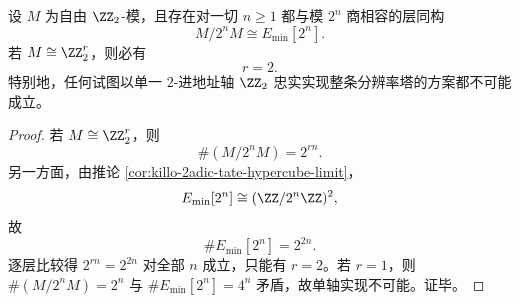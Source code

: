 \begin{corollary}\label{cor:xi-time-part9gc-resolution-tower-rank-two-rigidity}
设 \(M\) 为自由 \(\ZZ_2\)-模，且存在对一切 \(n\ge 1\) 都与模 \(2^n\) 商相容的层同构
\[
M/2^nM\cong E_{\min}[2^n].
\]
若 \(M\cong \ZZ_2^r\)，则必有
\[
r=2.
\]
特别地，任何试图以单一 \(2\)-进地址轴 \(\ZZ_2\) 忠实实现整条分辨率塔的方案都不可能成立。
\end{corollary}
\begin{proof}
若 \(M\cong \ZZ_2^r\)，则
\[
\#(M/2^nM)=2^{rn}.
\]
另一方面，由推论 \ref{cor:killo-2adic-tate-hypercube-limit}，
\[
E_{\min}[2^n]\cong (\ZZ/2^n\ZZ)^2,
\]
故
\[
\#E_{\min}[2^n]=2^{2n}.
\]
逐层比较得 \(2^{rn}=2^{2n}\) 对全部 \(n\) 成立，只能有 \(r=2\)。若 \(r=1\)，则 \(\#(M/2^nM)=2^n\) 与 \(\#E_{\min}[2^n]=4^n\) 矛盾，故单轴实现不可能。证毕。
\end{proof}

